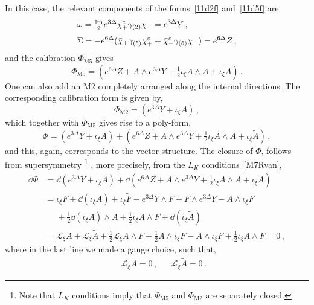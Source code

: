 \documentclass[debug]{phd}
\begin{document}
In this case, the relevant components of the forms~\eqref{11d2f} and~\eqref{11d5f} are 
%
	\begin{equation*}
		\begin{aligned}
			& \omega = \tfrac{\operatorname{\mathbb{I}m}}{2} e^{3\Delta} \bar{\chi}_{+}^c \gamma_{(2)} \chi_{-} = e^{3\Delta} Y \, ,\\[1mm]
			& \Sigma = -e^{6\Delta}(\bar{\chi}_+ \gamma_{(5)} \chi_+^c + \bar{\chi}_-^c \gamma_{(5)} \chi_- ) = e^{6\Delta} Z\, ,
		\end{aligned}
	\end{equation*}
%
and the calibration $\Phi_{\mathrm{M}5}$ gives
%
	\begin{equation}
		\Phi_{\mathrm{M}5} = (e^{6\Delta} Z + A \wedge e^{3\Delta} Y + \tfrac{1}{2}\iota_\xi A \wedge A + \iota_{\xi}\tilde{A})\, .
	\end{equation}	
%
One can also add an $\mathrm{M}2$ completely arranged along the internal directions. 
The corresponding calibration form is given by,
%
	\begin{equation}
		\Phi_{\mathrm{M}2} = (e^{3\Delta} Y + \iota_{\xi} A )\, ,
	\end{equation}
%
which together with $\Phi_{\mathrm{M}5}$ gives rise to a poly-form,
%
	\begin{equation}
		\Phi = (e^{3\Delta} Y + \iota_{\xi} A ) + (e^{6\Delta} Z + A \wedge e^{3\Delta} Y + \tfrac{1}{2}\iota_\xi A \wedge A + \iota_{\xi}\tilde{A})\, ,
	\end{equation}
%
and this, again, corresponds to the vector structure. 
The closure of $\Phi$, follows from supersymmetry%
		\footnote{%
			Note that $L_K$ conditions imply that $\Phi_{\mathrm{M}5}$ and $\Phi_{\mathrm{M}2}$ are separately closed.%
			}%
			, more precisely, from the $L_K$ conditions~\eqref{M7Rvan},
%
		\begin{equation}
			\begin{split}
				\dd  \Phi &= \dd  (e^{3\Delta} Y + \iota_{\xi} A ) + \dd  (e^{6\Delta} Z + A \wedge e^{3\Delta} Y + \tfrac{1}{2}\iota_\xi A \wedge A + \iota_{\xi}\tilde{A}) \\[1mm]
						& = \iota_\xi F + \dd  (\iota_\xi A) + \iota_\xi \tilde{F} - e^{3\Delta} Y \wedge F + F \wedge e^{3\Delta} Y - A \wedge \iota_\xi F \\
						& \phantom{=} + \tfrac{1}{2} \dd  (\iota_\xi A) \wedge A + \tfrac{1}{2} \iota_\xi A \wedge F + \dd  (\iota_\xi \tilde{A}) \\[1mm]
						&= \mathcal{L}_\xi A + \mathcal{L}_\xi \tilde{A} + \tfrac{1}{2} \mathcal{L}_\xi A \wedge F + \tfrac{1}{2} A \wedge \iota_\xi F - A \wedge \iota_\xi F + \tfrac{1}{2}\iota_\xi A \wedge F = 0\, ,
			\end{split}	
		\end{equation}
%
where in the last line we made a gauge choice, such that,
%
	\begin{align}
		& & & \mathcal{L}_\xi A= 0\, , & & \mathcal{L}_\xi \tilde{A}= 0\, . & 
	\end{align}
%
%
	
\end{document}
